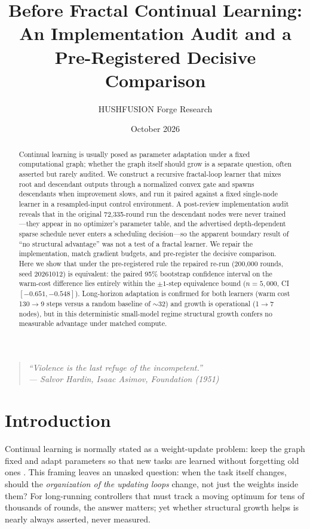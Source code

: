 \documentclass[11pt]{article}
\title{Before Fractal Continual Learning:\\\large An Implementation Audit and a Pre-Registered Decisive Comparison}
\author{HUSHFUSION Forge Research}
\date{October 2026}
\begin{document}
\maketitle

\begin{quote}
\itshape
``Violence is the last refuge of the incompetent.''
\\
--- Salvor Hardin, Isaac Asimov, \emph{Foundation} (1951)
\end{quote}

\begin{abstract}
Continual learning is usually posed as parameter adaptation under a fixed computational graph; whether the graph itself should grow is a separate question, often asserted but rarely audited. We construct a recursive fractal-loop learner that mixes root and descendant outputs through a normalized convex gate and spawns descendants when improvement slows, and run it paired against a fixed single-node learner in a resampled-input control environment. A post-review implementation audit reveals that in the original 72,335-round run the descendant nodes were never trained---they appear in no optimizer's parameter table, and the advertised depth-dependent sparse schedule never enters a scheduling decision---so the apparent boundary result of ``no structural advantage'' was not a test of a fractal learner. We repair the implementation, match gradient budgets, and pre-register the decisive comparison. Here we show that under the pre-registered rule the repaired re-run (200,000 rounds, seed 20261012) is equivalent: the paired 95\% bootstrap confidence interval on the warm-cost difference lies entirely within the $\pm 1$-step equivalence bound ($n=5{,}000$, CI $[-0.651,-0.548]$). Long-horizon adaptation is confirmed for both learners (warm cost 130$\rightarrow$9 steps versus a random baseline of $\sim$32) and growth is operational (1$\rightarrow$7 nodes), but in this deterministic small-model regime structural growth confers no measurable advantage under matched compute.
\end{abstract}

\section{Introduction}

Continual learning is normally stated as a weight-update problem: keep the graph fixed and adapt parameters so that new tasks are learned without forgetting old ones \cite{Finn2017,Li2017,Kirkpatrick2017}. This framing leaves an unasked question: when the task itself changes, should the \emph{organization of the updating loops} change, not just the weights inside them? For long-running controllers that must track a moving optimum for tens of thousands of rounds, the answer matters; yet whether structural growth helps is nearly always asserted, never measured.
\end{document}
